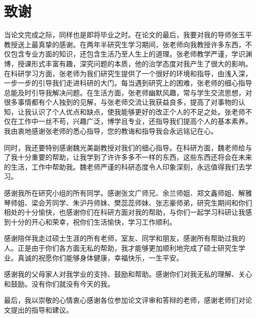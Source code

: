 \chapter{致谢}
当论文完成之际，同样也是即将毕业之时。在论文的最后，我要对我的导师张玉平教授送上最真挚的感谢。在两年半研究生学习期间，张老师向我教授许多东西，不仅包含专业方面的知识，还包含生活乃至人生上的道理。张老师教学严谨，学识渊博，授课形式丰富有趣，深究问题的本质，他的治学态度对我产生了很大的影响。在科研学习方面，张老师为我们研究生提供了一个很好的环境和指导，由浅入深，一步一步的引导我们走进科研的大门。每当遇到研究上的困难，张老师的细心指导总能及时引导我解决问题。在生活方面，张老师幽默风趣，常与学生交流思想，对很多事情都有个人独到的见解，与张老师交流让我获益良多，提高了对事物的认知，让我认识了个人优点和缺点，使我能够更好的改正个人的不足之处。张老师不仅在工作中一丝不苟，兴趣广泛，博学且专业，还指导我们提高个人的基本素养。我由衷地感谢张老师的悉心指导，您的教诲和指导我会永远铭记在心。

同时，我还要特别感谢魏光美副教授对我们的细心指导。在科研方面，魏老师给与了我十分重要的帮助，让我学到了许许多多不一样的东西，这些东西还将会在未来的生活，工作中帮助我。魏老师严谨的科研态度令人印象深刻，永远值得我们去学习。

感谢我所在研究小组的所有同学。感谢张文广师兄、余兰师姐、郑文鑫师姐、解雅琴师姐、梁会芳同学、朱沪丹师妹、樊蕊蕊师妹、张志豪师弟，研究生期间和你们相处的十分愉快，也感谢你们在科研方面对我的帮助，与你们一起学习科研让我感到十分的开心和荣幸，祝你们生活愉快，学习工作顺利。

感谢陪伴我走过硕士生涯的所有老师，室友、同学和朋友，感谢所有帮助过我的人。正是由于你们各方面无私的帮助，我才能够更加顺利地完成了硕士研究生学业。真诚的祝愿你们能够身体健康，幸福快乐，一生平安。

感谢我的父母家人对我学业的支持、鼓励和帮助。感谢你们对我无私的理解、关心和鼓励。没有你们就没有今天的我。


最后，我以崇敬的心情衷心感谢各位参加论文评审和答辩的老师，感谢老师们对论文提出的指导和建议。








